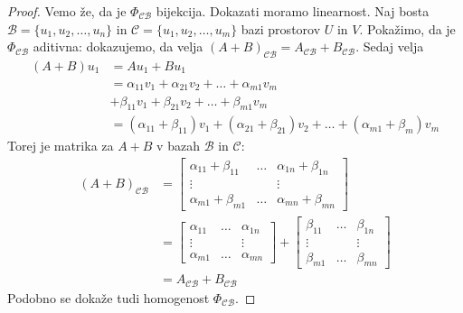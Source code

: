 \documentclass[10pt, a4paper]{article}
\newenvironment{noticeC}{%
  \tcolorbox[%
  notitle,
  empty,
  enhanced,  %
  breakable,
  coltext=black, 
  fontupper=\rmfamily,
  parbox=false,
  noparskip,
  sharp corners,
  boxrule=-1pt,  %
  frame hidden,
  left=7pt,  %
  right=7pt,
  top=5pt,
  bottom=5pt,
  before skip=2.5ex plus 2pt,
  after skip=2.5ex plus 2pt,
  overlay unbroken and last={%
  },
  ]}
{\endtcolorbox}
\newenvironment{dokaz}%
  {\begin{noticeC}\begin{proof}}%
  {\end{proof}\end{noticeC}}
\begin{document}
\begin{dokaz}
    Vemo že, da je $\Phi_\mathcal{CB}$ bijekcija. 
    Dokazati moramo linearnost.
    Naj bosta $\mathcal{B} = \{u_1, u_2, \dots, u_n\}$ in $\mathcal{C} = \{u_1, u_2, \dots, u_m\}$ bazi prostorov $U$ in $V$.
    Pokažimo, da je $\Phi_\mathcal{CB}$ aditivna: dokazujemo, da velja $(A+B)_\mathcal{CB} = A_\mathcal{CB} + B_\mathcal{CB}$.
        Sedaj velja
        \begin{align*}
            (A + B) u_1 &= A u_1 + B u_1\\
            &= \alpha_{11} v_1 + \alpha_{21} v_2 + \dots + \alpha_{m1} v_m\\
            &+ \beta_{11} v_1 + \beta_{21} v_2 + \dots + \beta_{m1} v_m\\
            &= (\alpha_{11} + \beta_{11}) v_1 + (\alpha_{21} + \beta_{21}) v_2 + \dots + (\alpha_{m1} + \beta_m) v_m
        \end{align*}
        Torej je matrika za $A + B$ v bazah $\mathcal{B}$ in $\mathcal{C}$:
        \begin{align*}
            (A+B)_\mathcal{CB} &=
            \begin{bmatrix}
                \alpha_{11} + \beta_{11} & \dots & \alpha_{1n} + \beta_{1n}\\
                \vdots & & \vdots\\
                \alpha_{m1} + \beta_{m1} & \dots & \alpha_{mn} + \beta_{mn}
            \end{bmatrix}\\
            &=
            \begin{bmatrix}
                \alpha_{11} & \dots & \alpha_{1n} \\
                \vdots & & \vdots\\
                \alpha_{m1} & \dots & \alpha_{mn}
            \end{bmatrix} + \begin{bmatrix}
                \beta_{11} & \dots &\beta_{1n}\\
                \vdots & & \vdots\\
                \beta_{m1} & \dots & \beta_{mn}
            \end{bmatrix}\\
            &= A_\mathcal{CB} + B_\mathcal{CB}
        \end{align*}
        Podobno se dokaže tudi homogenost $\Phi_\mathcal{CB}$.
\end{dokaz}
\end{document}

